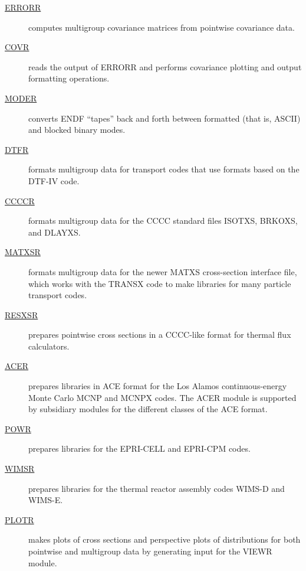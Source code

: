\begin{singlespace}
\begin{description}
\item[\hyperlink{sERRORRhy}{ERRORR}] computes multigroup covariance matrices
  from pointwise covariance data.

\item[\hyperlink{sCOVRhy}{COVR}] reads the output of ERRORR and performs
 covariance plotting and output formatting operations.

\item[\hyperlink{sMODERhy}{MODER}] converts ENDF ``tapes'' back and forth
 between formatted (that is, ASCII) and blocked binary modes.

\item[\hyperlink{sDTFRhy}{DTFR}] formats multigroup data for transport codes
 that use formats based on the DTF-IV code.

\item[\hyperlink{sCCCCRhy}{CCCCR}] formats multigroup data for the CCCC standard
  files ISOTXS, BRKOXS, and DLAYXS.

\item[\hyperlink{sMATXSRhy}{MATXSR}] formats multigroup data for the newer
 MATXS cross-section interface file, which works with the TRANSX code
 to make libraries for many particle transport codes.

\item[\hyperlink{sRESXSRhy}{RESXSR}] prepares pointwise cross sections in a
 CCCC-like format for thermal flux calculators.

\item[\hyperlink{sACERhy}{ACER}] prepares libraries in ACE format for the
  Los Alamos continuous-energy Monte Carlo MCNP and MCNPX codes.  The ACER
  module is supported by subsidiary modules for the different classes
  of the ACE format.

\item[\hyperlink{sPOWRhy}{POWR}] prepares libraries for the EPRI-CELL
  and EPRI-CPM codes.

\item[\hyperlink{sWIMSRhy}{WIMSR}] prepares libraries for the thermal reactor
  assembly codes WIMS-D and WIMS\nobreakdash-E.

\item[\hyperlink{sPLOTRhy}{PLOTR}] makes plots of cross sections and
  perspective plots of distributions for both pointwise and multigroup
  data by generating input for the VIEWR module.


\end{description}
\end{singlespace}
